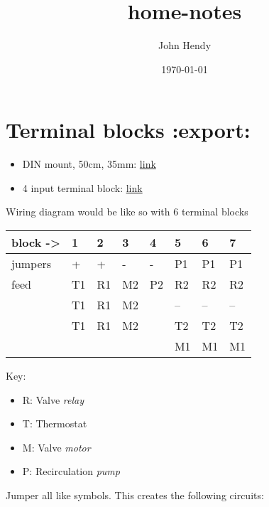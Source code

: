 \documentclass[11pt]{article}
\title{home-notes}
\author{John Hendy}
\date{\today}
\begin{document}
\maketitle

\setcounter{tocdepth}{3}
\tableofcontents
\vspace*{1cm}

\section{Terminal blocks \textbf{:export:}}
\label{sec-1}

\begin{itemize}
\item DIN mount, 50cm, 35mm: \href{http://www.newark.com/omron-industrial-automation/pfp-50n/din-mounting-rail-35mm-aluminium/dp/93B2043}{link}
\item 4 input terminal block: \href{http://www.newark.com/wago/2001-1401/terminal-block-din-rail-4pos-22/dp/28K2005}{link}
\end{itemize}

Wiring diagram would be like so with 6 terminal blocks


\begin{center}
\begin{tabular}{llllllll}
 block ->  &  1   &  2   &  3   &  4   &  5   &  6   &  7   \\
\hline
 jumpers   &  +   &  +   &  -   &  -   &  P1  &  P1  &  P1  \\
 feed      &  T1  &  R1  &  M2  &  P2  &  R2  &  R2  &  R2  \\
           &  T1  &  R1  &  M2  &      &  --  &  --  &  --  \\
           &  T1  &  R1  &  M2  &      &  T2  &  T2  &  T2  \\
           &      &      &      &      &  M1  &  M1  &  M1  \\
\end{tabular}
\end{center}



Key:
\begin{itemize}
\item R: Valve \emph{relay}
\item T: Thermostat
\item M: Valve \emph{motor}
\item P: Recirculation \emph{pump}
\end{itemize}

Jumper all like symbols. This creates the following circuits:
\end{document}
